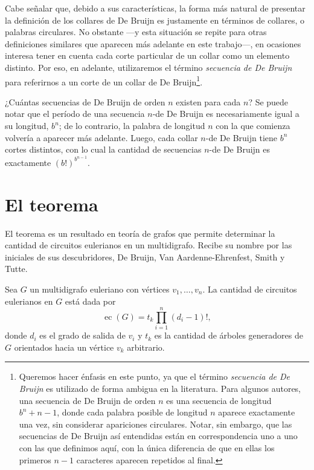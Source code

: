Cabe señalar que, debido a sus características, la forma más natural de
presentar la definición de los collares de De Bruijn es justamente en términos
de collares, o palabras circulares. No obstante ---y esta situación se repite
para otras definiciones similares que aparecen más adelante en este trabajo---,
en ocasiones interesa tener en cuenta cada corte particular de un collar como
un elemento distinto. Por eso, en adelante, utilizaremos el término
\emph{secuencia de De Bruijn} para referirnos a un corte de un collar de De
Bruijn\footnote{Queremos hacer énfasis en este punto, ya que el término
\emph{secuencia de De Bruijn} es utilizado de forma ambigua en la literatura.
Para algunos autores, una secuencia de De Bruijn de orden $n$ es una secuencia
de longitud $b^n + n - 1$, donde cada palabra posible de longitud $n$ aparece
exactamente una vez, sin considerar apariciones circulares. Notar, sin embargo,
que las secuencias de De Bruijn así entendidas están en correspondencia uno a
uno con las que definimos aquí, con la única diferencia de que en ellas los
primeros $n-1$ caracteres aparecen repetidos al final.}.

¿Cuántas secuencias de De Bruijn de orden $n$ existen para cada $n$? Se puede notar que
el período de una secuencia $n$-de De Bruijn es necesariamente igual a su
longitud, $b^n$; de lo contrario, la palabra de longitud $n$ con la que comienza
volvería a aparecer más adelante. Luego, cada collar $n$-de De Bruijn tiene
$b^n$ cortes distintos, con lo cual la cantidad de secuencias $n$-de De Bruijn
es exactamente $(b!)^{b^{n-1}}$.

\section{El teorema \BEST{}}

El teorema \BEST{} es un resultado en teoría de grafos que permite determinar la
cantidad de circuitos eulerianos en un multidigrafo. Recibe su nombre por las
iniciales de sus descubridores, De Bruijn, Van Aardenne-Ehrenfest, Smith y
Tutte.

\begin{theorem*}
	Sea $G$ un multidigrafo euleriano con vértices $v_1, \dots, v_n$.
	La cantidad de circuitos eulerianos en $G$ está dada por
	\[ \operatorname{ec}(G) = t_k \prod_{i=1}^n (d_i - 1)!, \]
	donde $d_i$ es el grado de salida de $v_i$ y $t_k$ es la cantidad de árboles
	generadores de $G$ orientados hacia un vértice $v_k$ arbitrario.
\end{theorem*}

